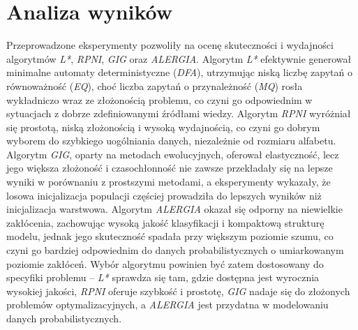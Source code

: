 \section{Analiza wyników}  
Przeprowadzone eksperymenty pozwoliły na ocenę skuteczności i wydajności algorytmów \textit{L*}, \textit{RPNI}, \textit{GIG} oraz \textit{ALERGIA}. Algorytm \textit{L*} efektywnie generował minimalne automaty deterministyczne (\textit{DFA}), utrzymując niską liczbę zapytań o równoważność (\textit{EQ}), choć liczba zapytań o przynależność (\textit{MQ}) rosła wykładniczo wraz ze złożonością problemu, co czyni go odpowiednim w sytuacjach z dobrze zdefiniowanymi źródłami wiedzy. Algorytm \textit{RPNI} wyróżniał się prostotą, niską złożonością i wysoką wydajnością, co czyni go dobrym wyborem do szybkiego uogólniania danych, niezależnie od rozmiaru alfabetu. Algorytm \textit{GIG}, oparty na metodach ewolucyjnych, oferował elastyczność, lecz jego większa złożoność i czasochłonność nie zawsze przekładały się na lepsze wyniki w porównaniu z prostszymi metodami, a eksperymenty wykazały, że losowa inicjalizacja populacji częściej prowadziła do lepszych wyników niż inicjalizacja warstwowa. Algorytm \textit{ALERGIA} okazał się odporny na niewielkie zakłócenia, zachowując wysoką jakość klasyfikacji i kompaktową strukturę modelu, jednak jego skuteczność spadała przy większym poziomie szumu, co czyni go bardziej odpowiednim do danych probabilistycznych o umiarkowanym poziomie zakłóceń. Wybór algorytmu powinien być zatem dostosowany do specyfiki problemu -- \textit{L*} sprawdza się tam, gdzie dostępna jest wyrocznia wysokiej jakości, \textit{RPNI} oferuje szybkość i prostotę, \textit{GIG} nadaje się do złożonych problemów optymalizacyjnych, a \textit{ALERGIA} jest przydatna w modelowaniu danych probabilistycznych. 
